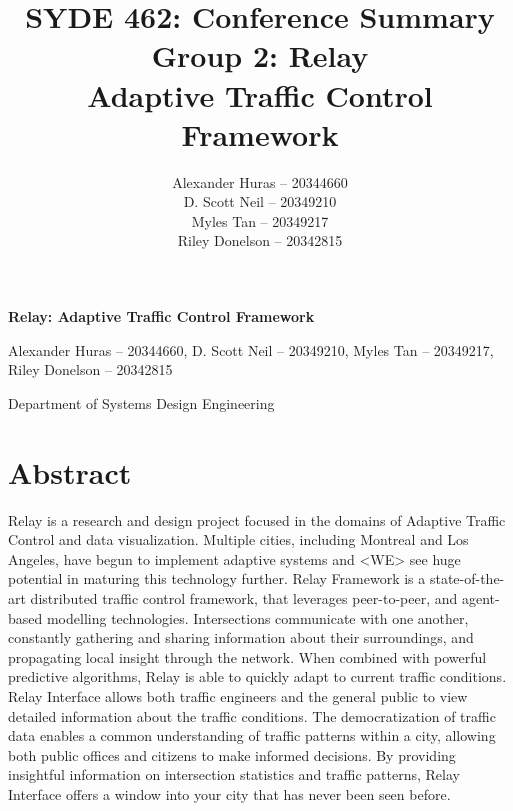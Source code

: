 \documentclass[a4paper,11pt]{report}
\author{  Alexander Huras -- 20344660\\
  D. Scott Neil -- 20349210\\
  Myles Tan -- 20349217\\
  Riley Donelson -- 20342815\\}
\title{SYDE 462: Conference Summary
\\Group 2: Relay \\
  Adaptive Traffic Control Framework}
\begin{document}
%

\centerline{  \bf \LARGE Relay: Adaptive Traffic Control Framework}
\centerline{Alexander Huras -- 20344660, D. Scott Neil -- 20349210, Myles Tan -- 20349217, Riley Donelson -- 20342815}
\centerline{Department of Systems Design Engineering}


\section{Abstract}
Relay is a research and design project focused in the domains of Adaptive Traffic Control and data visualization. Multiple cities, including Montreal and Los Angeles, have begun to implement adaptive systems and <WE> see huge potential in maturing this technology further. Relay Framework is a state-of-the-art distributed traffic control framework, that leverages peer-to-peer, and agent-based modelling technologies. Intersections communicate with one another, constantly gathering and sharing information about their surroundings, and propagating local insight through the network. When combined with powerful predictive algorithms, Relay is able to quickly adapt to current traffic conditions.
Relay Interface allows both traffic engineers and the general public to view detailed information about the traffic conditions. The democratization of traffic data enables a common understanding of traffic patterns within a city, allowing both public offices and citizens to make informed decisions. By providing insightful information on intersection statistics and traffic patterns, Relay Interface offers a window into your city that has never been seen before.
\end{document}
